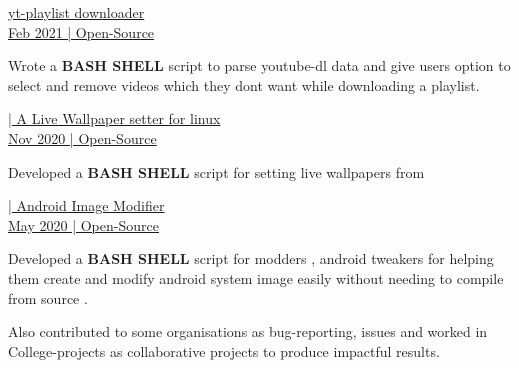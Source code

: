 \documentclass[]{deedy-resume-openfont}
\begin{document}
\begin{minipage}[t]{0.66\textwidth}
\href{https://github.com/creator54/yt-playlist}{yt-playlist downloader }\\
\href{https://github.com/creator54/yt-playlist}{Feb 2021 | Open-Source}
\vspace{\topsep} %
\begin{tightemize}
\item Wrote a \textbf{BASH SHELL} script to parse youtube-dl data and give users option to select and remove videos which they dont want while downloading a playlist.
\end{tightemize}
\sectionsep

\href{https://github.com/creator54/wallsetter}{| A Live Wallpaper setter for linux }\\
\href{https://github.com/creator54/wallsetter}{Nov 2020 | Open-Source}
\vspace{\topsep} %
\begin{tightemize}
\item Developed a \textbf{BASH SHELL} script for setting live wallpapers from
\end{tightemize}
\sectionsep

\href{https://github.com/creator54/aim}{| Android Image Modifier }\\
\href{https://github.com/creator54/aim}{May 2020 | Open-Source}
\vspace{\topsep} %
\begin{tightemize}
\item Developed a \textbf{BASH SHELL} script for modders , android tweakers for helping them create and modify android system image easily  without needing to compile from source .
\end{tightemize}
\sectionsep

Also contributed to some organisations as bug-reporting, issues and worked in College-projects as collaborative projects to produce impactful results.

\end{minipage} 
\end{document}
